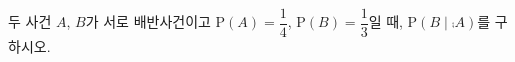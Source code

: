 두 사건 $A$, $B$가 서로 배반사건이고 $\mathrm{P}(A)=\dfrac{1}{4}$, $\mathrm{P}(B)=\dfrac{1}{3}$일 때, $\mathrm{P}(B\mid\comp{A})$를 구하시오.
